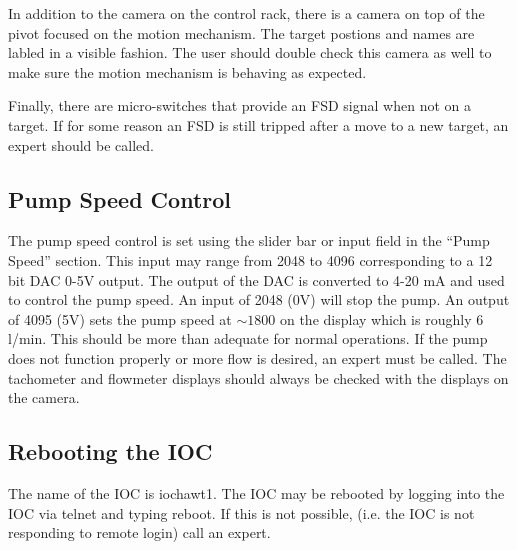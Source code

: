 {In addition to the camera on the control rack, there is a camera on
top of the pivot focused on the motion mechanism. The target postions
and names are labled in a visible fashion. The user should double
check this camera as well to make sure the motion mechanism is behaving
as expected.

Finally, there are micro-switches that provide an FSD signal when
not on a target. If for some reason an FSD is still tripped after
a move to a new target, an expert should be called.


\subsection{Pump Speed Control}

The pump speed control is set using the slider bar or input field
in the {}``Pump Speed'' section. This input may range from 2048
to 4096 corresponding to a 12 bit DAC 0-5V output. The output of the
DAC is converted to 4-20 mA and used to control the pump speed. An
input of 2048 (0V) will stop the pump. An output of 4095 (5V) sets
the pump speed at $\sim 1800$ on the display which is roughly 6 l/min.
This should be more than adequate for normal operations. If the pump
does not function properly or more flow is desired, an expert must
be called. The tachometer and flowmeter displays should always be
checked with the displays on the camera.


\subsection{Rebooting the IOC}

The name of the IOC is iochawt1. The IOC may be rebooted by logging
into the IOC via telnet and typing reboot. If this is not possible,
(i.e. the IOC is not responding to remote login) call an expert.

}
